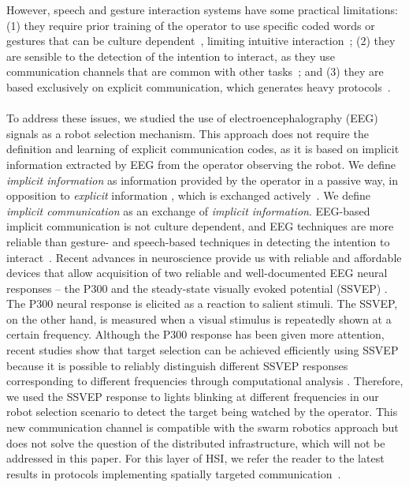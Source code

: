 \documentclass[smallextended]{svjour3}
\begin{document}
However, speech and gesture interaction systems have some practical limitations: (1) they require prior training of the operator to use specific coded words or gestures that can be culture dependent~\cite{Trovato2013}, limiting intuitive interaction~\cite{Kirchner2015};
(2) they are sensible to the detection of the intention to interact, as they use communication channels that are common with other tasks~\cite{Rzepecki2012}; and (3) they are based exclusively on explicit communication, which generates heavy protocols~\cite{Kirchner2015}.\\
\\ 
To address these issues, we studied the use of electroencephalography (EEG) signals as a robot selection mechanism. 
This approach does not require the definition and learning of explicit communication codes, as it is based on implicit information extracted by EEG from the operator observing the robot. 
We define \textit{implicit information} as information provided by the operator in a passive way, in opposition to \textit{explicit} information , which is exchanged actively~\cite{Kirchner2015}.
We define \textit{implicit communication} as an exchange of \textit{implicit information}.
EEG-based implicit communication is not culture dependent, and EEG techniques are more reliable than gesture- and speech-based techniques in detecting the intention to interact~\cite{Rzepecki2012}.
Recent advances in neuroscience provide us with reliable and affordable devices that allow acquisition of two reliable and well-documented EEG neural responses -- the P300 and the steady-state visually evoked potential (SSVEP) \cite{Beverina2003,Bi2013,Zhu2010}. 
The P300 neural response is elicited as a reaction to salient stimuli. 
The SSVEP, on the other hand, is measured when a visual stimulus is repeatedly shown at a certain frequency. Although the P300 response has been given more attention, recent studies show that target selection can be achieved efficiently using SSVEP because it is possible to reliably distinguish different SSVEP responses corresponding to different frequencies through computational analysis \cite{SSVEPfiability}.
Therefore, we used the SSVEP response to lights blinking at different frequencies in our robot selection scenario to detect the target being watched by the operator. This new communication channel is compatible with the swarm robotics approach but does not solve the question of the distributed infrastructure, which will not be addressed in this paper. For this layer of HSI, we refer the reader to the latest results in protocols implementing spatially targeted communication~\cite{mathews2015spatially}.\\ 
\end{document}

